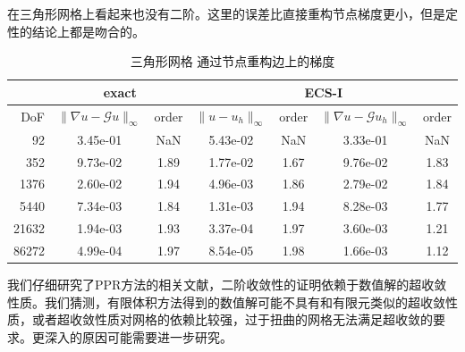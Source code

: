 \documentclass[12pt,a4paper]{article}
\theoremstyle{plain}
\begin{document}
在三角形网格上看起来也没有二阶。这里的误差比直接重构节点梯度更小，但是定性的结论上都是吻合的。

\begin{table}[hb]
\centering
\scriptsize
\begin{tabular}{r|cc|cc|cc}
\hline
& \multicolumn{2}{c|}{exact} & \multicolumn{4}{c}{ECS-I} \\
\hline
DoF & $\|\nabla u - \mathcal{G} u\|_\infty$ & order & $\|u - u_h\|_\infty$ & order & $\|\nabla u - \mathcal{G} u_h\|_\infty$ & order \\
\hline
92 & 3.45e-01 & NaN & 5.43e-02 & NaN & 3.33e-01 & NaN \\
352 & 9.73e-02 & 1.89 & 1.77e-02 & 1.67 & 9.76e-02 & 1.83 \\
1376 & 2.60e-02 & 1.94 & 4.96e-03 & 1.86 & 2.79e-02 & 1.84 \\
5440 & 7.34e-03 & 1.84 & 1.31e-03 & 1.94 & 8.28e-03 & 1.77 \\
21632 & 1.94e-03 & 1.93 & 3.37e-04 & 1.97 & 3.60e-03 & 1.21 \\
86272 & 4.99e-04 & 1.97 & 8.54e-05 & 1.98 & 1.66e-03 & 1.12 \\
\hline
\end{tabular}
\caption{三角形网格 通过节点重构边上的梯度}
\end{table}

\newpage
我们仔细研究了PPR方法的相关文献，二阶收敛性的证明依赖于数值解的超收敛性质。我们猜测，有限体积方法得到的数值解可能不具有和有限元类似的超收敛性质，或者超收敛性质对网格的依赖比较强，过于扭曲的网格无法满足超收敛的要求。更深入的原因可能需要进一步研究。


%
%
\end{document}
